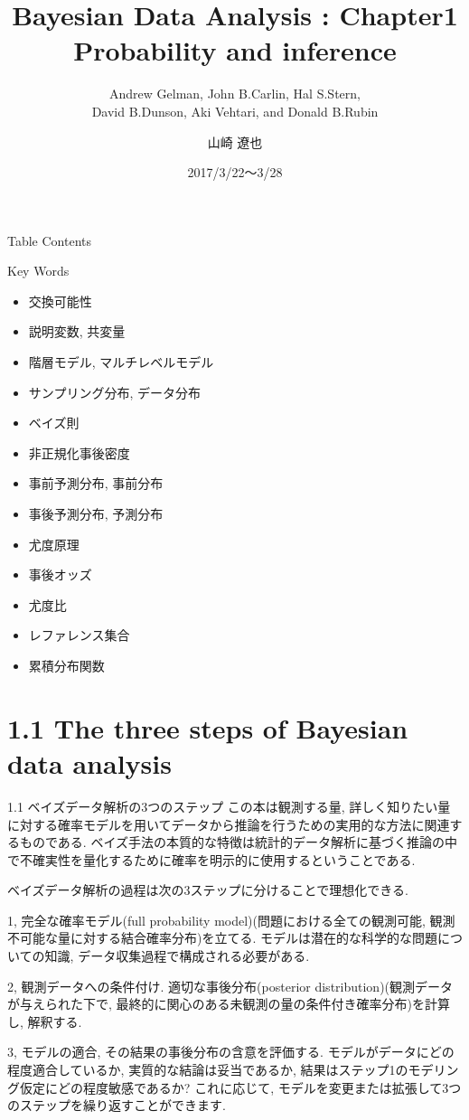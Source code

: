 \documentclass[10pt,dvipdfmx,a4]{beamer}
\title{Bayesian Data Analysis : Chapter1 \\Probability and inference}
\subtitle{Andrew Gelman, John B.Carlin, Hal S.Stern,\\David B.Dunson, Aki Vehtari, and Donald B.Rubin}
\author{山崎 遼也}
\institute{情報学科 数理工学コース 4回}
\date{2017/3/22～3/28}
\begin{document}
\frame{\titlepage}

\begin{frame}{Table Contents}
\begin{multicols}{2}
{\scriptsize \tableofcontents}
\end{multicols}
\end{frame}

\begin{frame}{Key Words}
\begin{multicols}{2}
{\scriptsize \begin{itemize}
\item 交換可能性
\item 説明変数, 共変量
\item 階層モデル, マルチレベルモデル
\item サンプリング分布, データ分布
\item ベイズ則
\item 非正規化事後密度
\item 事前予測分布, 事前分布
\item 事後予測分布, 予測分布
\item 尤度原理
\item 事後オッズ
\item 尤度比
\item レファレンス集合
\item 累積分布関数
\end{itemize}}
\end{multicols}
\end{frame}

\section{1.1 The three steps of Bayesian data analysis}
\begin{frame}{1.1 ベイズデータ解析の3つのステップ}
この本は観測する量, 詳しく知りたい量に対する確率モデルを用いてデータから推論を行うための実用的な方法に関連するものである.
ベイズ手法の本質的な特徴は統計的データ解析に基づく推論の中で不確実性を量化するために確率を明示的に使用するということである.

ベイズデータ解析の過程は次の3ステップに分けることで理想化できる.

1, 完全な確率モデル(full probability model)(問題における全ての観測可能, 観測不可能な量に対する結合確率分布)を立てる.
モデルは潜在的な科学的な問題についての知識, データ収集過程で構成される必要がある.

2, 観測データへの条件付け.
適切な事後分布(posterior distribution)(観測データが与えられた下で, 最終的に関心のある未観測の量の条件付き確率分布)を計算し, 解釈する.

3, モデルの適合, その結果の事後分布の含意を評価する.
モデルがデータにどの程度適合しているか, 実質的な結論は妥当であるか, 結果はステップ1のモデリング仮定にどの程度敏感であるか?
これに応じて, モデルを変更または拡張して3つのステップを繰り返すことができます.
\end{frame}
\end{document}
